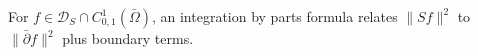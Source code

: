 
For $f \in \mathcal{D}_S \cap C_{0,1}^1(\bar{\Omega})$, an integration by parts formula relates $\|Sf\|^2$ to $\|\bar{\partial}f\|^2$ plus boundary terms.
